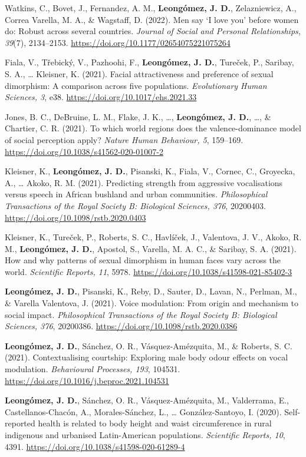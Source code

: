 \documentclass[11pt,a4paper,]{awesome-cv}
\begin{document}
Watkins, C., Bovet, J., Fernandez, A. M., \textbf{Leongómez, J. D.},
Zelazniewicz, A., Correa Varella, M. A., \& Wagstaff, D. (2022). Men say
`I love you' before women do: Robust across several countries.
\emph{Journal of Social and Personal Relationships, 39}(7), 2134--2153.
\url{https://doi.org/10.1177/02654075221075264}

Fiala, V., Třebický, V., Pazhoohi, F., \textbf{Leongómez, J. D.},
Tureček, P., Saribay, S. A., \ldots{} Kleisner, K. (2021). Facial
attractiveness and preference of sexual dimorphism: A comparison across
five populations. \emph{Evolutionary Human Sciences, 3}, e38.
\url{https://doi.org/10.1017/ehs.2021.33}

Jones, B. C., DeBruine, L. M., Flake, J. K., \ldots,
\textbf{Leongómez, J. D.}, \ldots, \& Chartier, C. R. (2021). To which
world regions does the valence-dominance model of social perception
apply? \emph{Nature Human Behaviour, 5}, 159--169.
\url{https://doi.org/10.1038/s41562-020-01007-2}

Kleisner, K., \textbf{Leongómez, J. D.}, Pisanski, K., Fiala, V.,
Cornec, C., Groyecka, A., \ldots{} Akoko, R. M. (2021). Predicting
strength from aggressive vocalisations versus speech in African bushland
and urban communities. \emph{Philosophical Transactions of the Royal
Society B: Biological Sciences, 376}, 20200403.
\url{https://doi.org/10.1098/rstb.2020.0403}

Kleisner, K., Tureček, P., Roberts, S. C., Havlíček, J., Valentova, J.
V., Akoko, R. M., \textbf{Leongómez, J. D.}, Apostol, S., Varella, M. A.
C., \& Saribay, S. A. (2021). How and why patterns of sexual dimorphism
in human faces vary across the world. \emph{Scientific Reports, 11},
5978. \url{https://doi.org/10.1038/s41598-021-85402-3}

\textbf{Leongómez, J. D.}, Pisanski, K., Reby, D., Sauter, D., Lavan,
N., Perlman, M., \& Varella Valentova, J. (2021). Voice modulation: From
origin and mechanism to social impact. \emph{Philosophical Transactions
of the Royal Society B: Biological Sciences, 376}, 20200386.
\url{https://doi.org/10.1098/rstb.2020.0386}

\textbf{Leongómez, J. D.}, Sánchez, O. R., Vásquez-Amézquita, M., \&
Roberts, S. C. (2021). Contextualising courtship: Exploring male body
odour effects on vocal modulation. \emph{Behavioural Processes, 193},
104531. \url{https://doi.org/10.1016/j.beproc.2021.104531}

\textbf{Leongómez, J. D.}, Sánchez, O. R., Vásquez-Amézquita, M.,
Valderrama, E., Castellanos-Chacón, A., Morales-Sánchez, L., \ldots{}
González-Santoyo, I. (2020). Self-reported health is related to body
height and waist circumference in rural indigenous and urbanised
Latin-American populations. \emph{Scientific Reports, 10}, 4391.
\url{https://doi.org/10.1038/s41598-020-61289-4}
\end{document}
